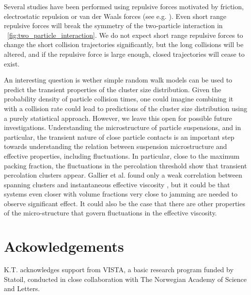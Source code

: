\documentclass[aps,pre,twocolumn,letterpaper,floatfix,showpacs]{revtex4}
\begin{document}
Several studies have been performed using repulsive forces motivated by friction, electrostatic repulsion or van der Waals forces (see e.g. \cite{brady1997microstructure,sierou2002rheology,morris2009review,seto2013discontinuous}). Even short range repulsive forces will break the symmetry of the two-particle interaction in \figurename~\ref{fig:two_particle_interaction}. We do not expect short range repulsive forces to change the short collision trajectories significantly, but the long collisions will be altered, and if the repulsive force is large enough, closed trajectories will cease to exist.

An interesting question is wether simple random walk models can be used to predict the transient properties of the cluster size distribution. Given the probability density of particle collision times, one could imagine combining it with a collision rate could lead to predictions of the cluster size distribution using a purely statistical approach. However, we leave this open for possible future investigations. Understanding the microstructure of particle suspensions, and in particular, the transient nature of close particle contacts is an important step towards understanding the relation between suspension microstructure and effective properties, including fluctuations. In particular, close to the maximum packing fraction, the fluctuations in the percolation threshold show that transient percolation clusters appear. Gallier et al. found only a weak correlation between spanning clusters and instantaneous effective viscosity \cite{gallier2015percolation}, but it could be that systems even closer with volume fractions very close to jamming are needed to observe significant effect. It could also be the case that there are other properties of the micro-structure that govern fluctuations in the effective viscosity. 

\section*{Ackowledgements}
K.T. acknowledges support from VISTA, a basic research program funded by Statoil, conducted in close collaboration with The Norwegian Academy of Science and Letters.

\appendix
\end{document}
